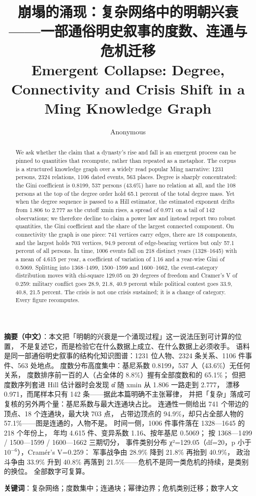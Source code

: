 \documentclass[conference]{IEEEtran}
\title{崩塌的涌现：复杂网络中的明朝兴衰——一部通俗明史叙事的度数、连通与危机迁移\\[2pt]
\large Emergent Collapse: Degree, Connectivity and Crisis Shift in a Ming Knowledge Graph}
\author{Anonymous}
\date{}
\begin{document}
\maketitle

\noindent\textbf{摘要（中文）}：本文把「明朝的兴衰是一个涌现过程」这一说法压到可计算的位置，
不是复述它，而是检验它在什么数据上成立、在什么数据上必须收手。
语料是同一部通俗明史叙事的结构化知识图谱：1231 位人物、2324 条关系、1106 件事件、563 处地点。
度数分布高度集中：基尼系数 0.8199，537 人（43.6\%）无任何关系，
度数排序前一百的人（占全体的 8.8\%）握有全部度数和的 65.1\%；
但把度数序列套进 Hill 估计器时会发现 α̂ 随 xmin 从 1.806 一路走到 2.777，
漂移 0.971，而尾样本只有 142 条——据此本篇明确不主张幂律，
并把「复杂」落成可复核的另外两个量：基尼系数与最大连通块占比。
连通性一侧给出 741 个带边的顶点、18 个连通块，最大块 703 点，
占带边顶点的 94.9\%，却只占全部人物的 57.1\%——图是连通的，人物不是。
时间一侧，1006 件事件落在 1328—1645 的 218 个年份上，
年均 4.615 件、变异系数 1.16、按年基尼 0.5069；
按 1368—1499 / 1500—1599 / 1600—1662 三期切分，
事件类别分布 χ²=129.05（df=20，p 小于 $10^{-6}$），Cramér's V=0.259：
军事战争由 28.9\% 降到 21.8\% 再抬到 40.9\%，
政治斗争由 33.9\% 升到 40.8\% 再落到 21.5\%——危机不是同一类危机的持续，是类别的换位。
全部数字可复算。

\noindent\textbf{关键词}：复杂网络；度数集中；连通块；幂律边界；危机类别迁移；数字人文

\vspace{6pt}
\begin{abstract}
We ask whether the claim that a dynasty's rise and fall is an emergent process can be
pinned to quantities that recompute, rather than repeated as a metaphor. The corpus is a
structured knowledge graph over a widely read popular Ming narrative: 1231 persons, 2324
relations, 1106 dated events, 563 places. Degree is sharply concentrated: the Gini
coefficient is 0.8199, 537 persons (43.6\%) have no relation at all, and the 108 persons
at the top of the degree order hold 65.1 percent of the total degree mass. Yet when the
degree sequence is passed to a Hill estimator, the estimated exponent drifts from 1.806 to
2.777 as the cutoff xmin rises, a spread of 0.971 on a tail of 142 observations; we
therefore decline to claim a power law and instead report two robust quantities, the Gini
coefficient and the share of the largest connected component. On connectivity the graph is
one piece: 741 vertices carry edges, there are 18 components, and the largest holds 703
vertices, 94.9 percent of edge-bearing vertices but only 57.1 percent of all persons. In
time, 1006 events fall on 218 distinct years (1328--1645) with a mean of 4.615 per year,
a coefficient of variation of 1.16 and a year-wise Gini of 0.5069. Splitting into
1368--1499, 1500--1599 and 1600--1662, the event-category distribution moves with
chi-square 129.05 on 20 degrees of freedom and Cramer's V of 0.259: military conflict goes
28.9, 21.8, 40.9 percent while political contest goes 33.9, 40.8, 21.5 percent. The crisis
is not one crisis sustained; it is a change of category. Every figure recomputes.
\end{abstract}
\end{document}
